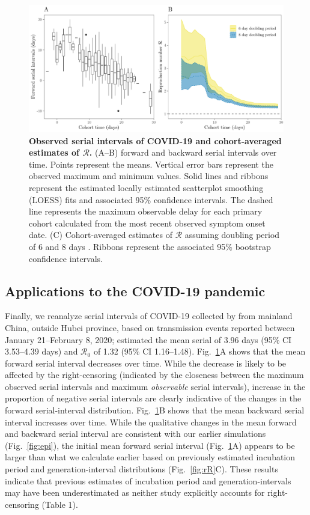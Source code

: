 \documentclass[12pt]{article}
\newcommand{\fref}[1]{Fig.~\ref{fig:#1}}
\newcommand{\Rx}[1]{\ensuremath{{\mathcal R}_{#1}}\xspace}
\newcommand{\Ro}{\Rx{0}}
\newcommand{\RR}{\ensuremath{{\mathcal R}}\xspace}
\begin{document}
\begin{figure}[!th]
\includegraphics[width=\textwidth]{serial_analysis.pdf}
\caption{
\textbf{Observed serial intervals of COVID-19 and cohort-averaged estimates of \RR.}
(A--B) forward and backward serial intervals over time.
Points represent the means. Vertical error bars represent the observed maximum and minimum values.
Solid lines and ribbons represent the estimated locally estimated scatterplot smoothing (LOESS) fits and associated 95\% confidence intervals.
The dashed line represents the maximum observable delay for each primary cohort calculated from the most recent observed symptom onset date.
(C) Cohort-averaged estimates of \RR assuming doubling period of 6 and 8 days \citep{li2020early, wu2020nowcasting}.
Ribbons represent the associated 95\% bootstrap confidence intervals.
}
\label{fig:du}
\end{figure}

\subsection{Applications to the COVID-19 pandemic}

Finally, we reanalyze serial intervals of COVID-19 collected by \cite{du2020serial} from mainland China, outside Hubei province, based on transmission events reported between January 21--February 8, 2020;
\cite{du2020serial} estimated the mean serial of 3.96 days (95\% CI 3.53–4.39 days) and \Ro of 1.32 (95\% CI 1.16–1.48).
\fref{du}A shows that the mean forward serial interval decreases over time.
While the decrease is likely to be affected by the right-censoring (indicated by the closeness between the maximum observed serial intervals and maximum \emph{observable} serial intervals),  increase in the proportion of negative serial intervals are clearly indicative of the changes in the forward serial-interval distribution.
\fref{du}B shows that the mean backward serial interval increases over time.
While the qualitative changes in the mean forward and backward serial interval are consistent with our earlier simulations (\fref{epi}), the initial mean forward serial interval (\fref{du}A) appears to be larger than what we calculate earlier based on previously estimated incubation period and generation-interval distributions (\fref{rR}C).
These results indicate that previous estimates of incubation period and generation-intervals may have been underestimated as neither study explicitly accounts for right-censoring (Table 1).
\end{document}
